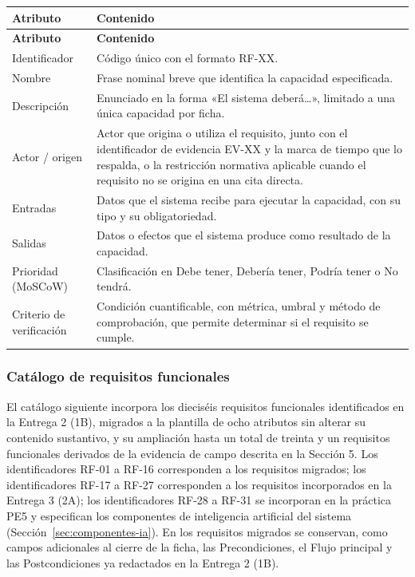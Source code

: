 \documentclass[12pt,a4paper]{article}
\begin{document}
\begin{center}
\begin{longtable}{|p{3.5cm}|p{10.7cm}|}
\hline
\textbf{Atributo} & \textbf{Contenido} \\
\hline
\endfirsthead
\hline
\textbf{Atributo} & \textbf{Contenido} \\
\hline
\endhead
\hline
\endfoot
\hline
\endlastfoot
Identificador & Código único con el formato RF-XX. \\
\hline
Nombre & Frase nominal breve que identifica la capacidad especificada. \\
\hline
Descripción & Enunciado en la forma «El sistema deberá\ldots», limitado a una única capacidad por ficha. \\
\hline
Actor / origen & Actor que origina o utiliza el requisito, junto con el identificador de evidencia EV-XX y la marca de tiempo que lo respalda, o la restricción normativa aplicable cuando el requisito no se origina en una cita directa. \\
\hline
Entradas & Datos que el sistema recibe para ejecutar la capacidad, con su tipo y su obligatoriedad. \\
\hline
Salidas & Datos o efectos que el sistema produce como resultado de la capacidad. \\
\hline
Prioridad (MoSCoW) & Clasificación en Debe tener, Debería tener, Podría tener o No tendrá. \\
\hline
Criterio de verificación & Condición cuantificable, con métrica, umbral y método de comprobación, que permite determinar si el requisito se cumple. \\
\hline
\end{longtable}
\label{tab:plantilla-rf}
\end{center}

\subsubsection{Catálogo de requisitos funcionales}
\label{sec:catalogo-rf}

El catálogo siguiente incorpora los dieciséis requisitos funcionales identificados en la Entrega 2 (1B), migrados a la plantilla de ocho atributos sin alterar su contenido sustantivo, y su ampliación hasta un total de treinta y un requisitos funcionales derivados de la evidencia de campo descrita en la Sección 5. Los identificadores RF-01 a RF-16 corresponden a los requisitos migrados; los identificadores RF-17 a RF-27 corresponden a los requisitos incorporados en la Entrega 3 (2A); los identificadores RF-28 a RF-31 se incorporan en la práctica PE5 y especifican los componentes de inteligencia artificial del sistema (Sección~\ref{sec:componentes-ia}). En los requisitos migrados se conservan, como campos adicionales al cierre de la ficha, las Precondiciones, el Flujo principal y las Postcondiciones ya redactados en la Entrega 2 (1B).
\end{document}
